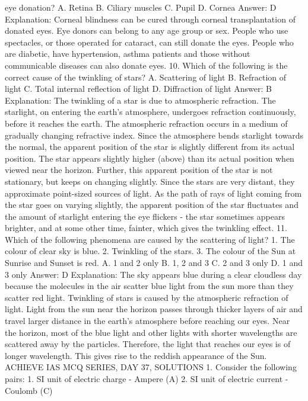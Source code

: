 eye donation?
A. Retina
B. Ciliary muscles
C. Pupil
D. Cornea
Answer: D
Explanation: Corneal blindness can be cured through corneal
transplantation of donated eyes. Eye donors can belong to any age
group or sex. People who use spectacles, or those operated for
cataract, can still donate the eyes. People who are diabetic, have
hypertension, asthma patients and those without communicable
diseases can also donate eyes.
10. Which of the following is the correct cause of the twinkling
of stars?
A. Scattering of light
B. Refraction of light
C. Total internal reflection of light
D. Diffraction of light
Answer: B
Explanation: The twinkling of a star is due to atmospheric
refraction.
The starlight, on entering the earth’s atmosphere, undergoes
refraction continuously, before it reaches the earth. The
atmospheric refraction occurs in a medium of gradually changing
refractive index. Since the atmosphere bends starlight towards the
normal, the apparent position of the star is slightly different from
its actual position. The star appears slightly higher (above) than its
actual position when viewed near the horizon.
Further, this apparent position of the star is not stationary, but
keeps on changing slightly. Since the stars are very distant, they
approximate point-sized sources of light. As the path of rays of
light coming from the star goes on varying slightly, the apparent
position of the star fluctuates and the amount of starlight entering
the eye flickers - the star sometimes appears brighter, and at some
other time, fainter, which gives the twinkling effect.
11. Which of the following phenomena are caused by the
scattering of light?
1. The colour of clear sky is blue.
2. Twinkling of the stars.
3. The colour of the Sun at Sunrise and Sunset is red.
A. 1 and 2 only
B. 1, 2 and 3
C. 2 and 3 only
D. 1 and 3 only
Answer: D
Explanation:
The sky appears blue during a clear cloudless day because the
molecules in the air scatter blue light from the sun more than they
scatter red light.
Twinkling of stars is caused by the atmospheric refraction of light.
Light from the sun near the horizon passes through thicker layers of
air and travel larger distance in the earth’s atmosphere before
reaching our eyes. Near the horizon, most of the blue light and
other lights with shorter wavelengths are scattered away by the
particles.
Therefore, the light that reaches our eyes is of longer wavelength.
This gives rise to the reddish appearance of the Sun.
ACHIEVE IAS MCQ SERIES, DAY 37, SOLUTIONS
1. Consider the following pairs:
1. SI unit of electric charge - Ampere (A)
2. SI unit of electric current - Coulomb (C)
